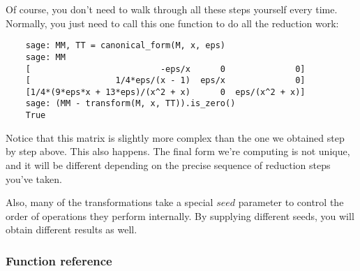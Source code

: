 \documentclass[12pt,a4paper]{article}
\begin{document}
Of course, you don't need to walk through all these steps yourself every time.
Normally, you just need to call this one function to do all the reduction work:

\begin{verbatim}
    sage: MM, TT = canonical_form(M, x, eps)
    sage: MM
    [                          -eps/x      0              0]
    [                 1/4*eps/(x - 1)  eps/x              0]
    [1/4*(9*eps*x + 13*eps)/(x^2 + x)      0  eps/(x^2 + x)]
    sage: (MM - transform(M, x, TT)).is_zero()
    True
\end{verbatim}

Notice that this matrix is slightly more complex than the one we obtained step by step above.
This also happens.
The final form we're computing is not unique, and it will be different depending on the precise sequence of reduction steps you've taken.

Also, many of the transformations take a special $seed$ parameter to control the order of operations they perform internally.
By supplying different seeds, you will obtain different results as well.

\subsubsection{Function reference}
\end{document}
